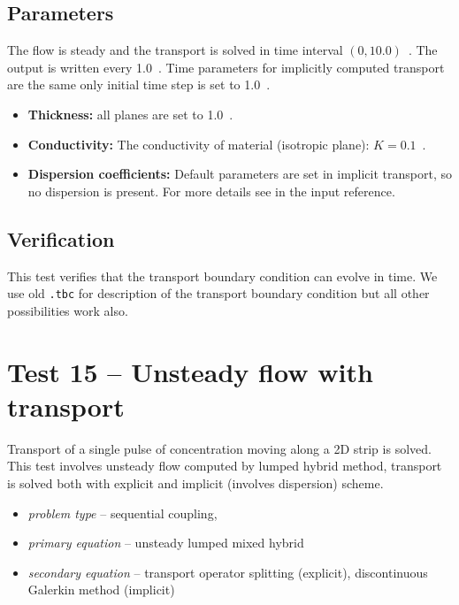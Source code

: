 \subsection*{Parameters}
The flow is steady and the transport is solved in time interval $(0,10.0)$~. The output is written every 
1.0~. Time parameters for implicitly computed transport are the same only initial time step is set to 1.0~.
%
\begin{itemize}
  \item \textbf{Thickness:} all planes are set to 1.0~.
  \item \textbf{Conductivity:} The conductivity of material (isotropic plane): $K=0.1$~.
  \item \textbf{Dispersion coefficients:} Default parameters are set in implicit transport, so no dispersion is present. 
        For more details see  in the input reference.
\end{itemize}
%

\subsection*{Verification}
This test verifies that the transport boundary condition can evolve in time. We use old \verb'.tbc' for description 
of the transport boundary condition but all other possibilities work also.



\section{Test 15 -- Unsteady flow with transport}
Transport of a single pulse of concentration moving along a 2D strip is solved. This test involves unsteady flow computed by lumped hybrid method, transport is solved both with explicit and implicit (involves dispersion) scheme.
 
\begin{itemize} 
    \item \emph{problem type} -- sequential coupling, 
    \item \emph{primary equation} -- unsteady lumped mixed hybrid
    \item \emph{secondary equation} -- transport operator splitting (explicit), discontinuous Galerkin method (implicit)
  \end{itemize}

